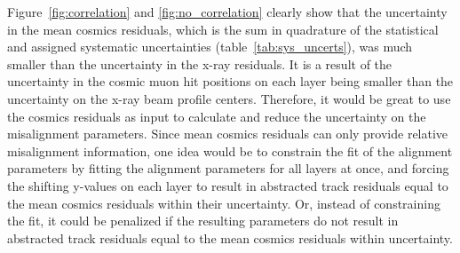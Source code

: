 Figure~\ref{fig:correlation} and \ref{fig:no_correlation} clearly show that the uncertainty in the mean cosmics residuals, which is the sum in quadrature of the statistical and assigned systematic uncertainties (table~\ref{tab:sys_uncerts}), was much smaller than the uncertainty in the x-ray residuals. It is a result of the uncertainty in the cosmic muon hit positions on each layer being smaller than the uncertainty on the x-ray beam profile centers. Therefore, it would be great to use the cosmics residuals as input to calculate and reduce the uncertainty on the misalignment parameters. Since mean cosmics residuals can only provide relative misalignment information, one idea would be to constrain the fit of the alignment parameters by fitting the alignment parameters for all layers at once, and forcing the shifting y-values on each layer to result in abstracted track residuals equal to the mean cosmics residuals within their uncertainty. Or, instead of constraining the fit, it could be penalized if the resulting parameters do not result in abstracted track residuals equal to the mean cosmics residuals within uncertainty. 


